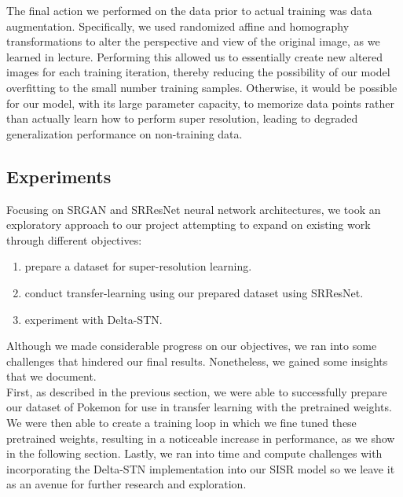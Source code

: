 \documentclass[11pt,titlepage]{article}
\begin{document}
The final action we performed on the data prior to actual training was data augmentation. Specifically, we used randomized affine and homography transformations to alter the perspective and view of the original image, as we learned in lecture. Performing this allowed us to essentially create new altered images for each training iteration, thereby reducing the possibility of our model overfitting to the small number training samples. Otherwise, it would be possible for our model, with its large parameter capacity, to memorize data points rather than actually learn how to perform super resolution, leading to degraded generalization performance on non-training data.


\subsection*{Experiments}
Focusing on SRGAN and SRResNet neural network architectures, we took an exploratory approach to our project attempting to expand on existing work through different objectives:
\begin{enumerate}
    \item prepare a dataset for super-resolution learning.
    \item conduct transfer-learning using our prepared dataset using SRResNet.
    \item experiment with Delta-STN.
\end{enumerate}
Although we made considerable progress on our objectives, we ran into some challenges that hindered our final results. Nonetheless, we gained some insights that we document.\\

First, as described in the previous section, we were able to successfully prepare our dataset of Pokemon for use in transfer learning with the pretrained weights. We were then able to create a training loop in which we fine tuned these pretrained weights, resulting in a noticeable increase in performance, as we show in the following section. Lastly, we ran into time and compute challenges with incorporating the Delta-STN implementation into our SISR model so we leave it as an avenue for further research and exploration.
\end{document}

